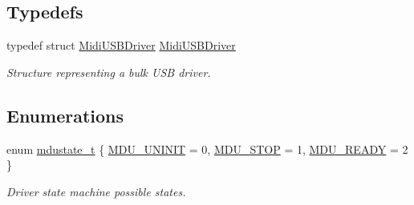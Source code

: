\subsection*{Typedefs}
\begin{DoxyCompactItemize}
\item 
typedef struct \hyperlink{structMidiUSBDriver}{Midi\+U\+S\+B\+Driver} \hyperlink{group__MIDI__USB_ga6f6e4a9a3715905f731618419195caeb}{Midi\+U\+S\+B\+Driver}\hypertarget{group__MIDI__USB_ga6f6e4a9a3715905f731618419195caeb}{}\label{group__MIDI__USB_ga6f6e4a9a3715905f731618419195caeb}

\begin{DoxyCompactList}\small\item\em Structure representing a bulk U\+SB driver. \end{DoxyCompactList}\end{DoxyCompactItemize}
\subsection*{Enumerations}
\begin{DoxyCompactItemize}
\item 
enum \hyperlink{group__MIDI__USB_gaf100a937cc2fe8a2a694884d6ec92485}{mdustate\+\_\+t} \{ \hyperlink{group__MIDI__USB_ggaf100a937cc2fe8a2a694884d6ec92485a872997df0e7465da70e4f1e37b3507ec}{M\+D\+U\+\_\+\+U\+N\+I\+N\+IT} = 0, 
\hyperlink{group__MIDI__USB_ggaf100a937cc2fe8a2a694884d6ec92485accf69965e5109667e5593415ca70fe06}{M\+D\+U\+\_\+\+S\+T\+OP} = 1, 
\hyperlink{group__MIDI__USB_ggaf100a937cc2fe8a2a694884d6ec92485a87df2c76063f4f72e57ec1a82d21a618}{M\+D\+U\+\_\+\+R\+E\+A\+DY} = 2
 \}\begin{DoxyCompactList}\small\item\em Driver state machine possible states. \end{DoxyCompactList}
\end{DoxyCompactItemize}
